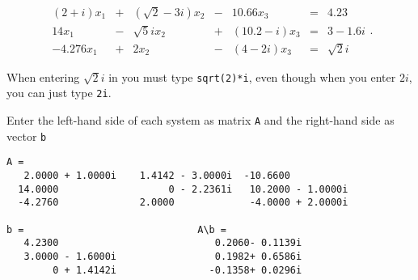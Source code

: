 \documentclass{ximera}
\begin{document}
\begin{exercise} \label{c2.5.2c}
\[
\begin{array}{rcrcrcr}
 (2+i) x_1 & + & (\sqrt{2}-3i)x_2 & - &    10.66 x_3 & = &     4.23 \\
    14 x_1 & - &    \sqrt{5}i x_2 & + & (10.2-i) x_3 & = &    3-1.6i \\
-4.276 x_1 & + &            2 x_2 & - &   (4-2i) x_3 & = & \sqrt{2}i
\end{array}.
\]

  When entering $\sqrt{2}i$ in \Matlab you must type
{\tt sqrt(2)*i}, even though when you enter $2i$, you can just type
{\tt 2i}.

\begin{solution}

Enter the left-hand side of each system as matrix {\tt A} 
and the right-hand side as vector {\tt b}

\begin{verbatim}
A =
   2.0000 + 1.0000i    1.4142 - 3.0000i  -10.6600
  14.0000                   0 - 2.2361i   10.2000 - 1.0000i
  -4.2760              2.0000             -4.0000 + 2.0000i

b =                              A\b =
   4.2300                           0.2060- 0.1139i
   3.0000 - 1.6000i                 0.1982+ 0.6586i
        0 + 1.4142i                -0.1358+ 0.0296i
\end{verbatim}























\end{solution}
\end{exercise}
\end{document}
